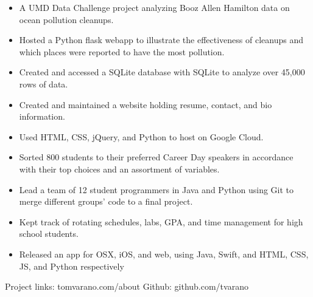 \documentclass[11pt]{article}
\begin{document}
\vspace{2mm}
{\fontsize{10}{12}\robotocondlight
\begin{itemize}[noitemsep,nolistsep]
    \item A UMD Data Challenge project analyzing Booz Allen Hamilton data on ocean pollution cleanups. 
    \item Hosted a {\robotocond Python flask} webapp to illustrate the effectiveness of cleanups and which places were reported to have the most pollution. 
    \item Created and accessed a {\robotocond SQLite} database with SQLite to analyze over 45,000 rows of data.
\end{itemize}
{\fontsize{10}{12}\robotocondlight
\begin{itemize}[noitemsep,nolistsep]
    \item Created and maintained a website holding resume, contact, and bio information.
    \item Used {\robotocond HTML}, {\robotocond CSS}, {\robotocond jQuery}, and {\robotocond Python} to host on {\robotocond Google Cloud}.
\end{itemize}
\begin{itemize}[noitemsep,nolistsep]
    \item Sorted 800 students to their preferred Career Day speakers in accordance with their top choices and an assortment of variables.
    \item Lead a team of 12 student programmers in {\robotocond Java} and {\robotocond Python} using {\robotocond Git} to merge different groups’ code to a final project.
\end{itemize}
\begin{itemize}[noitemsep,nolistsep]
    \item Kept track of rotating schedules, labs, GPA, and time management for high school students. 
    \item Released an app for OSX, iOS, and web, using {\robotocond Java}, {\robotocond Swift},
     and {\robotocond HTML}, {\robotocond CSS}, {\robotocond JS}, and {\robotocond Python} respectively
\end{itemize}
{\fontsize{8}{10}\robotocondlight Project links: tomvarano.com/about \hfill Github: github.com/tvarano
}
\vspace{-5mm}
\hsep
\vspace{-3mm}

}}
\end{document}
